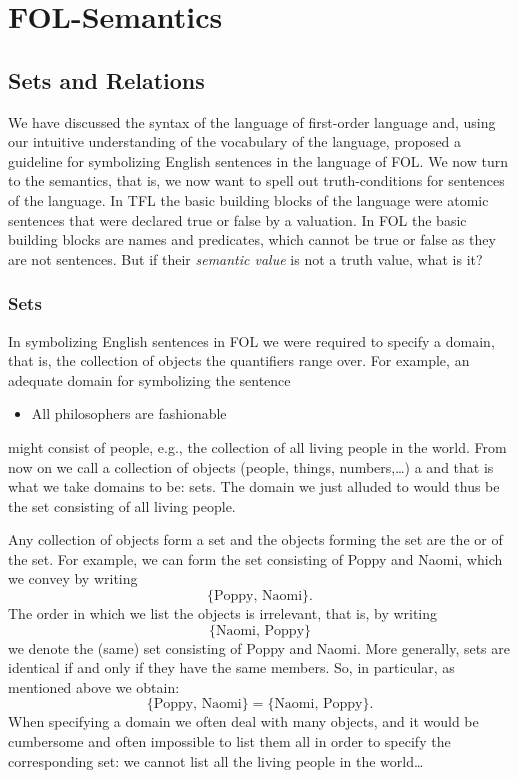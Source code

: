 \part{FOL-Semantics}
\label{ch.semantics}

\chapter{Sets and Relations}
We have discussed the syntax of the language of first-order language and, using our intuitive understanding of the vocabulary of the language, proposed a guideline for symbolizing English sentences in the language of FOL. We now turn to the semantics, that is, we now want to spell out truth-conditions for sentences of the language. In TFL the basic building blocks of the language were atomic sentences that were declared true or false by a valuation. In FOL the basic building blocks are names and predicates, which cannot be true or false as they are not sentences. But if their \emph{semantic value} is not a truth value, what is it?


\section{Sets}
In symbolizing English sentences in FOL we were required to specify a domain, that is, the collection of objects the quantifiers range over. For example, an adequate domain for symbolizing the sentence
\begin{itemize}
\item All philosophers are fashionable
\end{itemize}
might consist of people, e.g.,  the collection of all living people in the world. From now on we call a collection of objects (people, things, numbers,\ldots) a  and that is what we take domains to be: sets. The domain we just alluded to would thus be the set consisting of all living people.

Any collection of objects form a set and the objects forming the set are the  or  of the set. For example, we can form the set consisting of Poppy and Naomi, which we convey by writing
$$\{\text{Poppy, Naomi}\}.$$
The order in which we list the objects is irrelevant, that is, by writing
$$\{\text{Naomi, Poppy}\}$$
we denote the (same) set consisting of Poppy and Naomi. More generally, sets are identical if and only if they have the same members. So, in particular, as mentioned above we obtain:
$$\{\text{Poppy, Naomi}\}=\{\text{Naomi, Poppy}\}.$$  
When specifying a domain we often deal with many objects, and it would be cumbersome and often impossible to list them all in order to specify the corresponding set: we cannot list all the living people in the world\ldots

